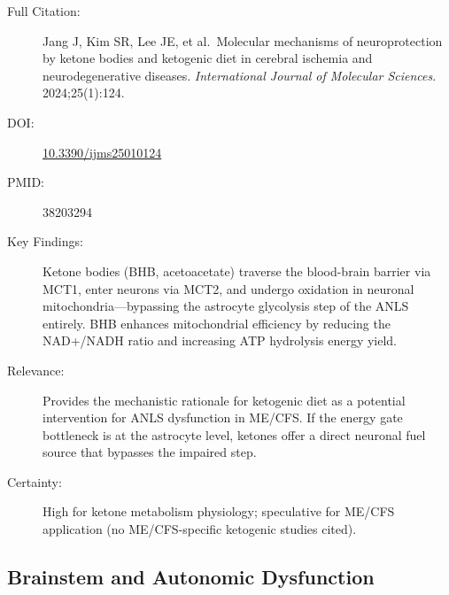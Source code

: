 \begin{description}
    \item[Full Citation:] Jang J, Kim SR, Lee JE, et al.\ Molecular mechanisms of neuroprotection by ketone bodies and ketogenic diet in cerebral ischemia and neurodegenerative diseases. \textit{International Journal of Molecular Sciences}. 2024;25(1):124.
    \item[DOI:] \href{https://doi.org/10.3390/ijms25010124}{10.3390/ijms25010124}
    \item[PMID:] 38203294
    \item[Key Findings:] Ketone bodies (BHB, acetoacetate) traverse the blood-brain barrier via MCT1, enter neurons via MCT2, and undergo oxidation in neuronal mitochondria---bypassing the astrocyte glycolysis step of the ANLS entirely. BHB enhances mitochondrial efficiency by reducing the NAD+/NADH ratio and increasing ATP hydrolysis energy yield.
    \item[Relevance:] Provides the mechanistic rationale for ketogenic diet as a potential intervention for ANLS dysfunction in ME/CFS. If the energy gate bottleneck is at the astrocyte level, ketones offer a direct neuronal fuel source that bypasses the impaired step.
    \item[Certainty:] High for ketone metabolism physiology; speculative for ME/CFS application (no ME/CFS-specific ketogenic studies cited).
\end{description}

\subsection{Brainstem and Autonomic Dysfunction}

